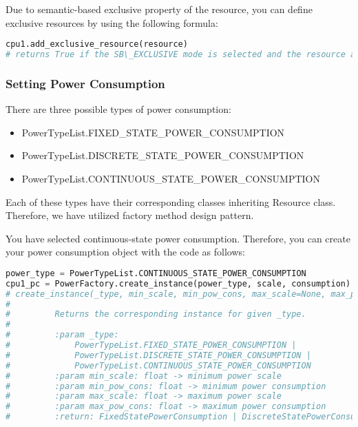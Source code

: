 \documentclass[]{scrartcl}
\begin{document}
Due to semantic-based exclusive property of the resource, you can define exclusive resources by using the following formula:

\begin{lstlisting}[language=Python, frame=single, label={lst:cpu1addSBExclusiveResource}, caption={A function for adding exclusive resources.}]
cpu1.add_exclusive_resource(resource)
# returns True if the SB\_EXCLUSIVE mode is selected and the resource argument is not in the list of exclusive resources. Otherwise, it returns False.
\end{lstlisting}
        
        
\subsubsection{Setting Power Consumption}
There are three possible types of power consumption:
\begin{itemize}
    \item \textsf{PowerTypeList.FIXED\_STATE\_POWER\_CONSUMPTION}
    \item \textsf{PowerTypeList.DISCRETE\_STATE\_POWER\_CONSUMPTION}
    \item \textsf{PowerTypeList.CONTINUOUS\_STATE\_POWER\_CONSUMPTION}
\end{itemize}
Each of these types have their corresponding classes inheriting \textsf{Resource} class. Therefore, we have utilized factory method design pattern.
        
You have selected continuous-state power consumption. Therefore, you can create your power consumption object with the code as follows:

\begin{lstlisting}[language=Python, frame=single, label={lst:cpu1settingPowerConsumptionContinuous}, caption={Power consumption object is created for Continuous-State Power Consumption type.}]
power_type = PowerTypeList.CONTINUOUS_STATE_POWER_CONSUMPTION
cpu1_pc = PowerFactory.create_instance(power_type, scale, consumption)
# create_instance(_type, min_scale, min_pow_cons, max_scale=None, max_pow_cons=None) -> FixedStatePowerConsumption | DiscreteStatePowerConsumption | ContinuousStatePowerConsumption
# 
#         Returns the corresponding instance for given _type.
# 
#         :param _type:
#             PowerTypeList.FIXED_STATE_POWER_CONSUMPTION |
#             PowerTypeList.DISCRETE_STATE_POWER_CONSUMPTION |
#             PowerTypeList.CONTINUOUS_STATE_POWER_CONSUMPTION
#         :param min_scale: float -> minimum power scale
#         :param min_pow_cons: float -> minimum power consumption
#         :param max_scale: float -> maximum power scale
#         :param max_pow_cons: float -> maximum power consumption
#         :return: FixedStatePowerConsumption | DiscreteStatePowerConsumption | ContinuousStatePowerConsumption
\end{lstlisting}
        
\end{document}

